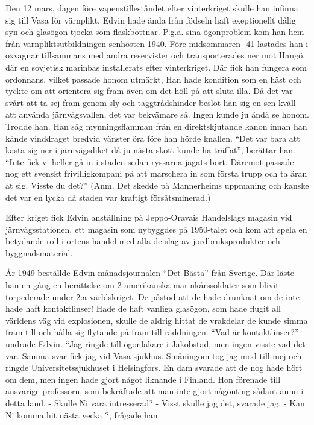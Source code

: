 Den 12 mars, dagen före vapenstilleståndet efter vinterkriget skulle han infinna sig till Vasa för värnplikt. Edvin hade ända från födseln haft exeptionellt dålig syn och glasögon tjocka som flaskbottnar. P.g.a. sina ögonproblem kom han hem från värnpliktsutbildningen senhösten 1940. Före midsommaren -41 lastades han i oxvagnar tillsammans med andra reservister och transporterades ner mot Hangö, där en sovjetisk marinbas installerats efter vinterkriget. Där fick han fungera som ordonnans, vilket passade honom utmärkt, Han hade kondition som en häst och tyckte om att orientera sig fram även om det höll på att sluta illa. Då det var svårt att ta sej fram genom sly och taggtrådshinder beslöt han sig en sen kväll att använda järnvägsvallen, det var bekvämare så. Ingen kunde ju ändå se honom. Trodde han. Han såg mynningsflamman från en direktskjutande kanon innan han kände vinddraget bredvid vänster öra före han hörde knallen. ``Det var bara att kasta sig ner i järnvägsdiket då ju nästa skott kunde ha träffat'', berättar han. ``Inte fick vi heller gå in i staden sedan ryssarna jagats bort. Däremot passade nog ett svenskt frivilligkompani på att marschera in som första trupp och ta äran åt sig. Visste du det?''
(Anm. Det skedde på Mannerheims uppmaning och kanske det var en lycka då staden var kraftigt försåtsminerad.)

Efter kriget fick Edvin anställning på Jeppo-Oravais Handelslags magasin vid järnvägsstationen, ett magasin som nybyggdes på 1950-talet och kom att spela en betydande roll i ortens handel med alla de slag av jordbruksprodukter och byggnadsmaterial.

År 1949 beställde Edvin månadsjournalen ``Det Bästa'' från Sverige. Där läste han en gång en berättelse om 2 amerikanska marinkårssoldater som blivit torpederade under 2:a världskriget. De påstod att de hade drunknat om de inte hade haft kontaktlinser! Hade de haft vanliga glasögon, som hade flugit all världens väg vid explosionen, skulle de aldrig hittat de vrakdelar de kunde simma fram till och hålla sig flytande på fram till räddningen. ``Vad är kontaktlinser?'' undrade Edvin. ``Jag ringde till ögonläkare i Jakobstad, men ingen visste vad det var. Samma svar fick jag vid Vasa sjukhus. Småningom tog jag mod till mej och ringde Universitetssjukhuset i Helsingfors. En dam svarade att de nog hade hört om dem, men ingen hade gjort något liknande i Finland. Hon förenade till ansvarige professorn, som bekräftade att man inte gjort någonting sådant ännu i detta land.
  - Skulle Ni vara intresserad?
  - Visst skulle jag det, svarade jag.
  - Kan Ni komma hit nästa vecka ?, frågade han.

